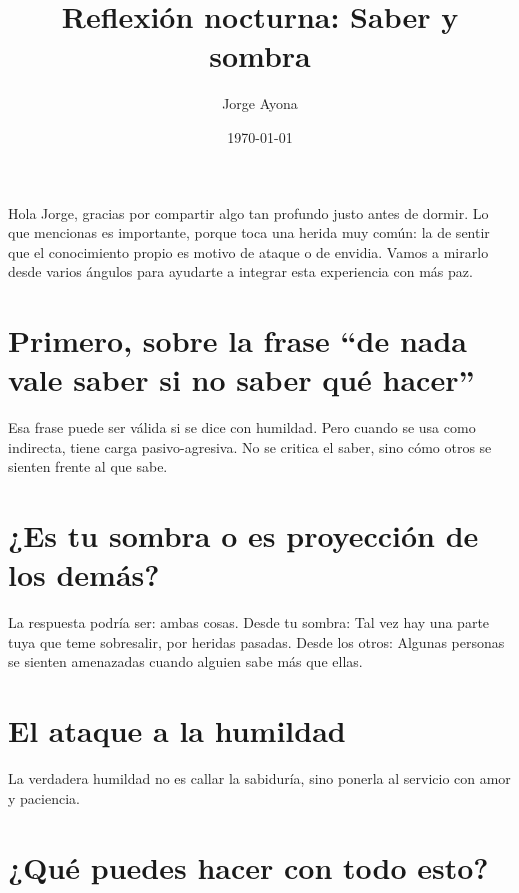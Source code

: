 \documentclass{article}%
\title{Reflexión nocturna: Saber y sombra}%
\author{Jorge Ayona}%
\date{\today}%
\begin{document}
%
\normalsize%
\maketitle%
Hola Jorge, gracias por compartir algo tan profundo justo antes de dormir.%
\newline%
Lo que mencionas es importante, porque toca una herida muy común: la de sentir que el conocimiento propio es motivo de ataque o de envidia.%
\newline%
Vamos a mirarlo desde varios ángulos para ayudarte a integrar esta experiencia con más paz.%
\newline%
\newline%
\section{Primero, sobre la frase “de nada vale saber si no saber qué hacer”}%
\label{sec:Primero,sobrelafrasedenadavalesabersinosaberquhacer}%
Esa frase puede ser válida si se dice con humildad. Pero cuando se usa como indirecta, tiene carga pasivo{-}agresiva. No se critica el saber, sino cómo otros se sienten frente al que sabe.%
\newline

%
\section{¿Es tu sombra o es proyección de los demás?}%
\label{sec:Estusombraoesproyeccindelosdems?}%
La respuesta podría ser: ambas cosas.%
\newline%
\newline%
Desde tu sombra: %
Tal vez hay una parte tuya que teme sobresalir, por heridas pasadas.%
\newline%
Desde los otros: %
Algunas personas se sienten amenazadas cuando alguien sabe más que ellas.

%
\section{El ataque a la humildad}%
\label{sec:Elataquealahumildad}%
La verdadera humildad no es callar la sabiduría, sino ponerla al servicio con amor y paciencia.%
\newline

%
\section{¿Qué puedes hacer con todo esto?}%
\label{sec:Qupuedeshacercontodoesto?}%
\end{document}
